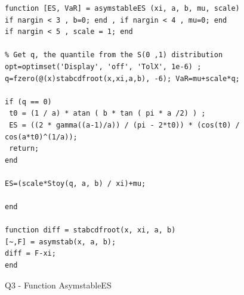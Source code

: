 \documentclass[12pt]{article}
\begin{document}
\begin{Program}[!htb]
\begin{lstlisting}[style=Matlab-editor,basicstyle=\mlttfamily\footnotesize] 
%Q3 - Function: AsymstableES --------------------------------------------
function [ES, VaR] = asymstableES (xi, a, b, mu, scale)
if nargin < 3 , b=0; end , if nargin < 4 , mu=0; end
if nargin < 5 , scale = 1; end 

% Get q, the quantile from the S(0 ,1) distribution
opt=optimset('Display', 'off', 'TolX', 1e-6) ;
q=fzero(@(x)stabcdfroot(x,xi,a,b), -6); VaR=mu+scale*q;

if (q == 0)
 t0 = (1 / a) * atan ( b * tan ( pi * a /2) ) ;
 ES = ((2 * gamma((a-1)/a)) / (pi - 2*t0)) * (cos(t0) / cos(a*t0)^(1/a));
 return;
end

ES=(scale*Stoy(q, a, b) / xi)+mu;

end

function diff = stabcdfroot(x, xi, a, b)
[~,F] = asymstab(x, a, b);
diff = F-xi;
end
\end{lstlisting}
\caption{Q3 - Function AsymstableES}
\label{Q3 - Function AsymstableES}
\end{Program}
\end{document}
